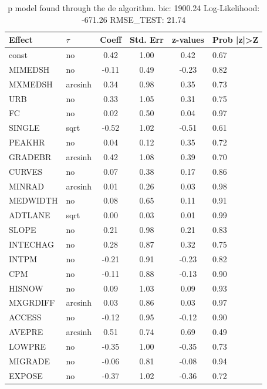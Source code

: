\begin{table}
	\caption{p model found through the de algorithm. bic: 1900.24 Log-Likelihood: -671.26 RMSE_TEST: 21.74}
	\begin{center}
		\begin{tabular}{|l|l|c|c|c|l|}
			\hline
			Effect & $\tau$ & Coeff & Std. Err & z-values & Prob |z|>Z \\
			\hline
			const & no & 0.42 & 1.00 & 0.42 & 0.67 \\
			\hline
			MIMEDSH & no & -0.11 & 0.49 & -0.23 & 0.82 \\
			\hline
			MXMEDSH & arcsinh & 0.34 & 0.98 & 0.35 & 0.73 \\
			\hline
			URB & no & 0.33 & 1.05 & 0.31 & 0.75 \\
			\hline
			FC & no & 0.02 & 0.50 & 0.04 & 0.97 \\
			\hline
			SINGLE & sqrt & -0.52 & 1.02 & -0.51 & 0.61 \\
			\hline
			PEAKHR & no & 0.04 & 0.12 & 0.35 & 0.72 \\
			\hline
			GRADEBR & arcsinh & 0.42 & 1.08 & 0.39 & 0.70 \\
			\hline
			CURVES & no & 0.07 & 0.38 & 0.17 & 0.86 \\
			\hline
			MINRAD & arcsinh & 0.01 & 0.26 & 0.03 & 0.98 \\
			\hline
			MEDWIDTH & no & 0.08 & 0.65 & 0.11 & 0.91 \\
			\hline
			ADTLANE & sqrt & 0.00 & 0.03 & 0.01 & 0.99 \\
			\hline
			SLOPE & no & 0.21 & 0.98 & 0.21 & 0.83 \\
			\hline
			INTECHAG & no & 0.28 & 0.87 & 0.32 & 0.75 \\
			\hline
			INTPM & no & -0.21 & 0.91 & -0.23 & 0.82 \\
			\hline
			CPM & no & -0.11 & 0.88 & -0.13 & 0.90 \\
			\hline
			HISNOW & no & 0.09 & 1.03 & 0.09 & 0.93 \\
			\hline
			MXGRDIFF & arcsinh & 0.03 & 0.86 & 0.03 & 0.97 \\
			\hline
			ACCESS & no & -0.12 & 0.95 & -0.12 & 0.90 \\
			\hline
			AVEPRE & arcsinh & 0.51 & 0.74 & 0.69 & 0.49 \\
			\hline
			LOWPRE & no & -0.35 & 1.00 & -0.35 & 0.73 \\
			\hline
			MIGRADE & no & -0.06 & 0.81 & -0.08 & 0.94 \\
			\hline
			EXPOSE & no & -0.37 & 1.02 & -0.36 & 0.72 \\

\end{tabular}
\end{center}
\end{table}
